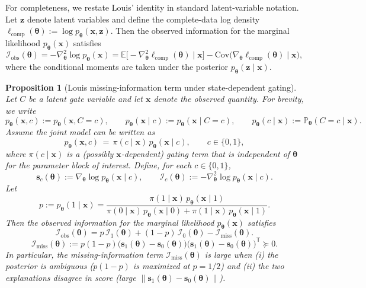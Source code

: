 \documentclass[twoside]{article}
\theoremstyle{plain}
\newtheorem{proposition}{Proposition}
\theoremstyle{definition}
\theoremstyle{remark}
\newcommand{\E}{\mathbb{E}}
\newcommand{\Cov}{\mathrm{Cov}}
\newcommand{\Io}{\bm{\mathcal{I}}_{\mathrm{obs}}}
\newcommand{\Imiss}{\bm{\mathcal{I}}_{\mathrm{miss}}}
\begin{document}
For completeness, we restate Louis' identity in standard latent-variable notation.
Let $\bm z$ denote latent variables and define the complete-data log density $\ell_{\mathrm{comp}}(\bm\theta):=\log p_{\bm\theta}(\bm x,\bm z)$.
Then the observed information for the marginal likelihood $p_{\bm\theta}(\bm x)$ satisfies
\begin{equation}
\label{eq:s:louis_identity}
\Io(\bm\theta)
= -\nabla_{\bm\theta}^2\log p_{\bm\theta}(\bm x)
= \E\big[-\nabla_{\bm\theta}^2\ell_{\mathrm{comp}}(\bm\theta)\mid \bm x\big]
- \Cov\big(\nabla_{\bm\theta}\ell_{\mathrm{comp}}(\bm\theta)\mid \bm x\big),
\end{equation}
where the conditional moments are taken under the posterior $p_{\bm\theta}(\bm z\mid \bm x)$.

\begin{proposition}[Louis missing-information term under state-dependent gating]
\label{prop:s:louis_missing_state_dependent_gate}
Let $C$ be a latent gate variable and let $\bm{x}$ denote the observed quantity.
For brevity, we write
\begin{equation}
p_{\bm\theta}(\bm x,c):=p_{\bm\theta}(\bm x, C{=}c),\qquad
p_{\bm\theta}(\bm x\mid c):=p_{\bm\theta}(\bm x\mid C{=}c),\qquad
p_{\bm\theta}(c\mid \bm x):=\mathbb{P}_{\bm\theta}(C{=}c\mid \bm x).
\end{equation}
Assume the joint model can be written as
\begin{equation}
p_{\bm\theta}(\bm x,c) \,=\, \pi(c\mid \bm x)\,p_{\bm\theta}(\bm x\mid c),\qquad c\in\{0,1\},
\end{equation}
where $\pi(c\mid \bm x)$ is a (possibly $\bm x$-dependent) gating term that is \emph{independent of $\bm\theta$} for the parameter block of interest.
Define, for each $c\in\{0,1\}$,
\begin{equation}
\bm s_c(\bm\theta) := \nabla_{\bm\theta}\log p_{\bm\theta}(\bm x\mid c),
\qquad
\bm{\mathcal I}_c(\bm\theta) := -\nabla_{\bm\theta}^2\log p_{\bm\theta}(\bm x\mid c).
\end{equation}
Let
\begin{equation}
p := p_{\bm\theta}(1\mid \bm x)
= \frac{\pi(1\mid \bm x)\,p_{\bm\theta}(\bm x\mid 1)}{\pi(0\mid \bm x)\,p_{\bm\theta}(\bm x\mid 0)+\pi(1\mid \bm x)\,p_{\bm\theta}(\bm x\mid 1)}.
\end{equation}
Then the observed information for the marginal likelihood $p_{\bm\theta}(\bm x)$ satisfies
\begin{equation}
\label{eq:s:2switch_state_dependent}
\Io(\bm\theta)
=
p\,\bm{\mathcal{I}}_1(\bm\theta) + (1-p)\,\bm{\mathcal{I}}_0(\bm\theta)
- \Imiss(\bm\theta).
\end{equation}
\begin{equation}
\label{eq:s:2switch_state_dependent_miss}
\Imiss(\bm\theta)
:=
p(1-p)\big(\bm{s}_1(\bm\theta)-\bm{s}_0(\bm\theta)\big)\big(\bm{s}_1(\bm\theta)-\bm{s}_0(\bm\theta)\big)^{\mathsf T}
\succeq 0.
\end{equation}
In particular, the missing-information term $\Imiss(\bm\theta)$ is large when (i) the posterior is ambiguous
($p(1-p)$ is maximized at $p=1/2$) and (ii) the two explanations disagree in score
(large $\|\bm{s}_1(\bm\theta)-\bm{s}_0(\bm\theta)\|$).
\end{proposition}
\end{document}
